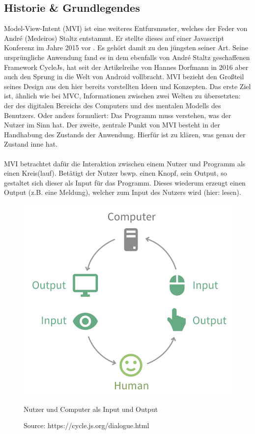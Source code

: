 \subsection{Historie \& Grundlegendes}
Model-View-Intent (MVI) ist eine weiteres Entfursmuster, welches der Feder von André (Medeiros) Staltz entstammt. Er stellte dieses auf einer Javascript Konferenz im Jahre 2015 vor
\cite{modelViewIntentIntroduction}. Es gehört damit zu den jüngsten seiner Art.
Seine ursprüngliche Anwendung fand es in dem ebenfalls von André Staltz geschaffenen Framework CycleJs, hat seit der Artikelreihe von Hannes Dorfmann in 2016
\cite{modelViewIntentOnAndroidHannesDorfmann2016}
aber auch den Sprung in die Welt von Android vollbracht. MVI bezieht den Großteil seines Design aus den hier bereits vorstellten Ideen und Konzepten. Das erste Ziel ist, ähnlich wie bei MVC, Informationen zwischen zwei Welten zu übersetzten: der des digitalen Bereichs des Computers und des mentalen Modells des Benutzers. Oder anders formuliert: Das Programm muss verstehen, was der Nutzer im Sinn hat.
Der zweite, zentrale Punkt von MVI besteht in der Handhabung des Zustands der Anwendung. Hierfür ist zu klären, was genau der Zustand inne hat.
\\
\\
MVI betrachtet dafür die Interaktion zwischen einem Nutzer und Programm als einen Kreis(lauf). Betätigt der Nutzer bswp. einen Knopf, sein Output, so gestaltet sich dieser als Input für das Programm. Dieses wiederum erzeugt einen Output (z.B. eine Meldung), welcher zum Input des Nutzers wird (hier: lesen).
\begin{figure}[ht]
	\centering
	\includegraphics[height=0.5\textwidth]{./images/mvi-cycle}
	\caption{Nutzer und Computer als Input und Output}
	\caption*{Source: https://cycle.js.org/dialogue.html}
	\label{fig:userComputerInputOutput}
\end{figure}
\\
